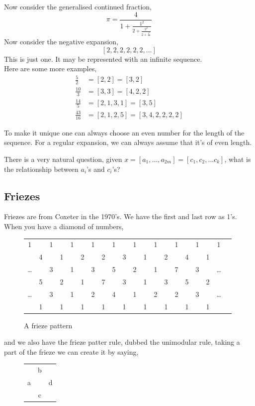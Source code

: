 \documentclass{article}
\begin{document}
Now consider the generalised continued fraction,
$$ \pi = \frac{4}{1 + \frac{1^2}{2 + \frac{3^2}{2 + \frac{5^2}{\ddots}}}} $$
Now consider the negative expansion,
$$ \![2, 2, 2, 2, 2, 2, \dots\!] $$
This is just one. It may be represented with an infinite sequence.\\

Here are some more examples,
\begin{align*}
  \frac{5}{2} &= [2, 2] = \![ 3, 2 \!]\\
  \frac{10}{3} &= [3, 3] = \![ 4, 2, 2 \!]\\
  \frac{14}{5} &= [2, 1, 3, 1] = \![ 3, 5 \!]\\
  \frac{43}{16} &= [2, 1, 2, 5] = \![ 3, 4, 2, 2, 2, 2 \!]
\end{align*}

\begin{remark}
  To make it unique one can always choose an even number for the length of the sequence. For a regular expansion, we can always assume that it's of even length.
\end{remark}

There is a very natural question, given $x = [a_1, \dots, a_{2m}] = \![c_1, c_2, \dots c_k \!]$, what is the relationship between $a_i$'s and $c_i$'s?

\subsection{Friezes}
Friezes are from Coxeter in the 1970's. We have the first and last row as 1's. When you have a diamond of numbers,

\begin{figure}[!ht]
\centering
\begin{tabular}{cccccccccccccccccccc}
 1&&1&&1&&1&&1&&1&&1&&1&&1&&1 \\
 &4&&1&&2&&2&&3&&1&&2&&4&&1&\\
 \dots&&3&&1&&3&&5&&2&&1&&7&&3&&\dots\\
 &5&&2&&1&&7&&3&&1&&3&&5&&2&\\
 \dots&&3&&1&&2&&4&&1&&2&&2&&3&&\dots\\
  &1&&1&&1&&1&&1&&1&&1&&1&&1& \\
\end{tabular}
\caption{A frieze pattern}
\end{figure}

and we also have the frieze patter rule, dubbed the unimodular rule, taking a part of the frieze we can create it by saying,
\begin{figure}[!ht]
  \centering
  \begin{tabular}{ccc}
    &b&\\
    a&&d\\
    &c&\\
  \end{tabular}
\end{figure}
\end{document}
